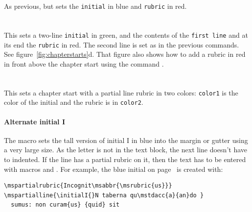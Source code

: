 \documentclass[a4paper, 12pt]{article}
\begin{document}
\paragraph{}\mbox{}\\

As previous, but sets the \texttt{initial} in blue and \texttt{rubric} in red. 

\paragraph{}\mbox{}\\

This sets a two-line \texttt{initial} in green, and the contents of the
\texttt{first line} and at its end the \texttt{rubric} in red. The
second line is set as in the previous commands. See
figure~\ref{fig:chapterstarts}d. That figure also shows how to add a
rubric in red in front above the chapter start using the command
.

\paragraph{}
\mbox{} \\

This sets a chapter start with a partial line rubric in two colors:
\texttt{color1} is the color of the initial and the rubric is in
\texttt{color2}.


\paragraph{Alternate initial I} The macro  sets the
tall version of initial I in blue into the margin or gutter using a
very large size. As the letter is not in the text block, the next line
doesn't have to indented. If the line has a partial rubric on it, then
the text has to be entered with macros  and
. For example, the blue initial on
page~\pageref{pg_carmina_sample} is created with:

\begin{verbatim}
\mspartialrubric{Incognit\msabbr{\msrubric{us}}}
\mspartialline{\initialI{}N taberna qu\mstdacc{a}{an}do }
  sumus: non curam{us} {quid} sit 
\end{verbatim}
\end{document}
